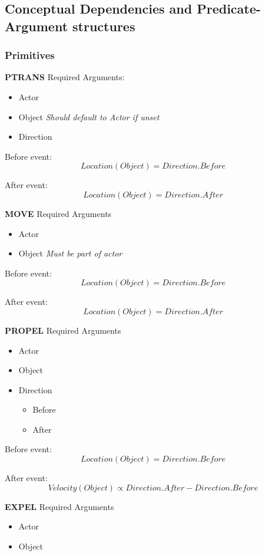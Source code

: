 \documentclass[../dissertation]{subfiles}
\begin{document}
\subsection{Conceptual Dependencies and Predicate-Argument structures}
\subsubsection{Primitives}

\textbf{PTRANS}
Required Arguments:

\begin{itemize}
\item Actor
\item Object \textit{Should default to Actor if unset}
\item Direction
\end{itemize}

Before event:
\[Location(Object) = \textit{Direction.Before}\]

After event:
\[Location(Object) = \textit{Direction.After}\]


\textbf{MOVE}
Required Arguments
\begin{itemize}
\item Actor
\item Object \textit{Must be part of actor}
\end{itemize}

Before event:
\[Location(Object) = \textit{Direction.Before}\]

After event:
\[Location(Object) = \textit{Direction.After}\]

\textbf{PROPEL}
Required Arguments
\begin{itemize}
	\item Actor
    \item Object
    \item Direction
    \begin{itemize}
    	\item Before
        \item After
    \end{itemize}
\end{itemize}

Before event:
\[Location(Object) = \textit{Direction.Before}\]

After event:
\[Velocity(Object) \propto \textit{Direction.After} - \textit{Direction.Before}\]

\textbf{EXPEL}
Required Arguments
\begin{itemize}
	\item Actor
    \item Object
\end{itemize}
\end{document}
